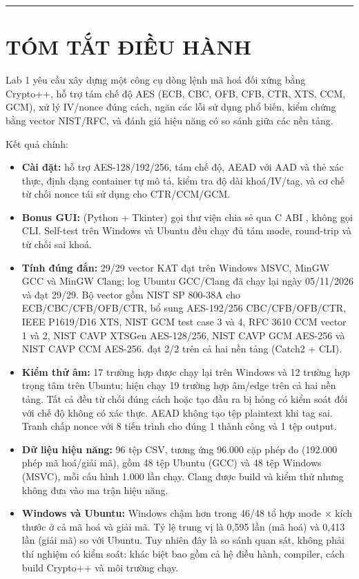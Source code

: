 \documentclass[12pt,a4paper,oneside]{report}
\let\origtexttt\texttt
\renewcommand{\texttt}[1]{\origtexttt{\seqsplit{#1}}}
\begin{document}
\par\noindent\rule{\textwidth}{0.4pt}


\chapter{TÓM TẮT ĐIỀU HÀNH}


Lab 1 yêu cầu xây dựng một công cụ dòng lệnh mã hoá đối xứng bằng Crypto++, hỗ trợ tám chế độ AES (ECB, CBC, OFB, CFB, CTR, XTS, CCM, GCM), xử lý IV/nonce đúng cách, ngăn các lỗi sử dụng phổ biến, kiểm chứng bằng vector NIST/RFC, và đánh giá hiệu năng có so sánh giữa các nền tảng.


Kết quả chính:


\begin{itemize}[leftmargin=*]
\item \textbf{Cài đặt:} \texttt{aestool} hỗ trợ AES-128/192/256, tám chế độ, AEAD với AAD và thẻ xác thực, định dạng container tự mô tả, kiểm tra độ dài khoá/IV/tag, và cơ chế từ chối nonce tái sử dụng cho CTR/CCM/GCM.
\item \textbf{Bonus GUI:} \texttt{gui/aestool\_gui.py} (Python + Tkinter) gọi thư viện chia sẻ qua C ABI \texttt{aesgui\_*}, không gọi CLI. Self-test trên Windows và Ubuntu đều chạy đủ tám mode, round-trip và từ chối sai khoá.
\item \textbf{Tính đúng đắn:} 29/29 vector KAT đạt trên Windows MSVC, MinGW GCC và MinGW Clang; log Ubuntu GCC/Clang đã chạy lại ngày 05/11/2026 và đạt 29/29. Bộ vector gồm NIST SP 800-38A cho ECB/CBC/CFB/OFB/CTR, bổ sung AES-192/256 CBC/CFB/OFB/CTR, IEEE P1619/D16 XTS, NIST GCM test case 3 và 4, RFC 3610 CCM vector 1 và 2, NIST CAVP XTSGen AES-128/256, NIST CAVP GCM AES-256 và NIST CAVP CCM AES-256. \texttt{ctest} đạt 2/2 trên cả hai nền tảng (Catch2 + CLI).
\item \textbf{Kiểm thử âm:} 17 trường hợp được chạy lại trên Windows và 12 trường hợp trọng tâm trên Ubuntu; \texttt{ctest} hiện chạy 19 trường hợp âm/edge trên cả hai nền tảng. Tất cả đều từ chối đúng cách hoặc tạo đầu ra bị hỏng có kiểm soát đối với chế độ không có xác thực. AEAD không tạo tệp plaintext khi tag sai. Tranh chấp nonce với 8 tiến trình cho đúng 1 thành công và 1 tệp output.
\item \textbf{Dữ liệu hiệu năng:} 96 tệp CSV, tương ứng 96.000 cặp phép đo (192.000 phép mã hoá/giải mã), gồm 48 tệp Ubuntu (GCC) và 48 tệp Windows (MSVC), mỗi cấu hình 1.000 lần chạy. Clang được build và kiểm thử nhưng không đưa vào ma trận hiệu năng.
\item \textbf{Windows và Ubuntu:} Windows chậm hơn trong 46/48 tổ hợp mode × kích thước ở cả mã hoá và giải mã. Tỷ lệ trung vị là 0,595 lần (mã hoá) và 0,413 lần (giải mã) so với Ubuntu. Tuy nhiên đây là so sánh quan sát, không phải thí nghiệm có kiểm soát: khác biệt bao gồm cả hệ điều hành, compiler, cách build Crypto++ và môi trường chạy.

\end{itemize}
\end{document}
